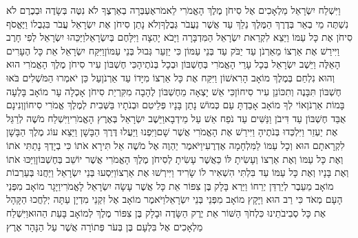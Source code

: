 \documentclass[../main/main.tex]{subfiles}
\begin{document}
\begin{multicols*}{\ncols}
וַיִּשְׁלַח יִשְׂרָאֵל מַלְאָכִים אֶל סִיחֹן מֶלֶךְ הָאֱמֹרִי לֵאמֹר\PreVerseSpace{}אֶעְבְּרָה בְאַרְצֶךָ לֹא נִטֶּה בְּשָׂדֶה וּבְכֶרֶם לֹא נִשְׁתֶּה מֵי בְאֵר בְּדֶרֶךְ הַמֶּלֶךְ נֵלֵךְ עַד אֲשֶׁר נַעֲבֹר גְּבֻלֶךָ\PreVerseSpace{}וְלֹא נָתַן סִיחֹן אֶת יִשְׂרָאֵל עֲבֹר בִּגְבֻלוֹ וַיֶּאֱסֹף סִיחֹן אֶת כָּל עַמּוֹ וַיֵּצֵא לִקְרַאת יִשְׂרָאֵל הַמִּדְבָּרָה וַיָּבֹא יָהְצָה וַיִּלָּחֶם בְּיִשְׂרָאֵל\PreVerseSpace{}וַיַּכֵּהוּ יִשְׂרָאֵל לְפִי חָרֶב וַיִּירַשׁ אֶת אַרְצוֹ מֵאַרְנֹן עַד יַבֹּק עַד בְּנֵי עַמּוֹן כִּי יַזְעֵר\SubEnd{} גְּבוּל בְּנֵי עַמּוֹן\PreVerseSpace{}וַיִּקַּח יִשְׂרָאֵל אֵת כָּל הֶעָרִים הָאֵלֶּה וַיֵּשֶׁב יִשְׂרָאֵל בְּכָל עָרֵי הָאֱמֹרִי בְּחֶשְׁבּוֹן וּבְכָל בְּנֹתֶיהָ\PreVerseSpace{}כִּי חֶשְׁבּוֹן עִיר סִיחֹן מֶלֶךְ הָאֱמֹרִי הוּא וְהוּא נִלְחַם בְּמֶלֶךְ מוֹאָב הָרִאשׁוֹן וַיִּקַּח אֶת כָּל אַרְצוֹ מִיָּדוֹ עַד אַרְנֹן\PreVerseSpace{}עַל כֵּן יֹאמְרוּ הַמֹּשְׁלִים בֹּאוּ חֶשְׁבּוֹן תִּבָּנֶה וְתִכּוֹנֵן עִיר סִיחוֹן\PreVerseSpace{}כִּי אֵשׁ יָצְאָה מֵחֶשְׁבּוֹן לֶהָבָה מִקִּרְיַת סִיחֹן אָכְלָה עָר מוֹאָב בָּלְעָה\SubEnd{} בָּמוֹת אַרְנֹן\PreVerseSpace{}אוֹי לְךָ מוֹאָב אָבַדְתָּ עַם כְּמוֹשׁ נָתַן בָּנָיו פְּלֵיטִם וּבְנֹתָיו בַּשְּׁבִית לְמֶלֶךְ אֱמֹרִי סִיחוֹן\PreVerseSpace{}וְנִינָם\SubEnd{} אֻבַּד\SubEnd{} חֶשְׁבּוֹן עַד דִּיבֹן וַנַּשִּׁים עַד נֹפַח אֵשׁ\SubEnd{} עַל\SubEnd{} מֵידְבָא\PreVerseSpace{}וַיֵּשֶׁב יִשְׂרָאֵל בְּאֶרֶץ הָאֱמֹרִי\PreVerseSpace{}וַיִּשְׁלַח מֹשֶׁה לְרַגֵּל אֶת יַעְזֵר וַיִּלְכְּדוּ בְּנֹתֶיהָ וַיִּירַשׁ אֶת הָאֱמֹרִי אֲשֶׁר שָׁם\PreVerseSpace{}וַיִּפְנוּ וַיַּעֲלוּ דֶּרֶךְ הַבָּשָׁן וַיֵּצֵא עוֹג מֶלֶךְ הַבָּשָׁן לִקְרָאתָם הוּא וְכָל עַמּוֹ לַמִּלְחָמָה אֶדְרֶעִי\PreVerseSpace{}וַיֹּאמֶר יַהְוֶה אֶל מֹשֶׁה אַל תִּירָא אֹתוֹ כִּי בְיָדְךָ נָתַתִּי אֹתוֹ וְאֶת כָּל עַמּוֹ וְאֶת אַרְצוֹ וְעָשִׂיתָ לּוֹ כַּאֲשֶׁר עָשִׂיתָ לְסִיחֹן מֶלֶךְ הָאֱמֹרִי אֲשֶׁר יוֹשֵׁב בְּחֶשְׁבּוֹן\PreVerseSpace{}וַיַּכּוּ אֹתוֹ וְאֶת בָּנָיו וְאֶת כָּל עַמּוֹ עַד בִּלְתִּי הִשְׁאִיר לוֹ שָׂרִיד וַיִּירְשׁוּ אֶת אַרְצוֹ\PreChapterSpace{}וַיִּסְעוּ בְּנֵי יִשְׂרָאֵל וַיַּחֲנוּ בְּעַרְבוֹת מוֹאָב מֵעֵבֶר לְיַרְדֵּן יְרֵחוֹ \ClosedSection{}וַיַּרְא בָּלָק בֶּן צִפּוֹר אֵת כָּל אֲשֶׁר עָשָׂה יִשְׂרָאֵל לָאֱמֹרִי\PreVerseSpace{}וַיָּגָר מוֹאָב מִפְּנֵי הָעָם מְאֹד כִּי רַב הוּא וַיָּקָץ מוֹאָב מִפְּנֵי בְּנֵי יִשְׂרָאֵל\PreVerseSpace{}וַיֹּאמֶר מוֹאָב אֶל זִקְנֵי מִדְיָן עַתָּה יְלַחֲכוּ הַקָּהָל אֶת כָּל סְבִיבֹתֵינוּ כִּלְחֹךְ הַשּׁוֹר אֵת יֶרֶק הַשָּׂדֶה וּבָלָק בֶּן צִפּוֹר מֶלֶךְ לְמוֹאָב בָּעֵת הַהוּא\PreVerseSpace{}וַיִּשְׁלַח מַלְאָכִים אֶל בִּלְעָם בֶּן בְּעֹר פְּתוֹרָה אֲשֶׁר עַל הַנָּהָר אֶרֶץ 
\end{multicols*}
\end{document}
